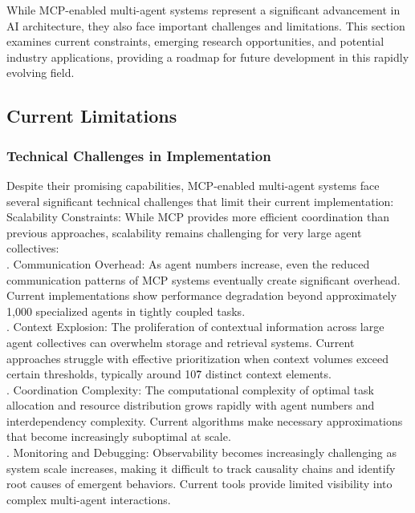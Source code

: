 While MCP-enabled multi-agent systems represent a significant advancement in AI architecture, they also face important challenges and limitations. This section examines current constraints, emerging research opportunities, and potential industry applications, providing a roadmap for future development in this rapidly evolving field.\\
\subsection{Current Limitations}
\subsubsection{Technical Challenges in Implementation}
Despite their promising capabilities, MCP-enabled multi-agent systems face several significant technical challenges that limit their current implementation:\\ \newline
Scalability Constraints: While MCP provides more efficient coordination than previous approaches, scalability remains challenging for very large agent collectives:\\ . Communication Overhead: As agent numbers increase, even the reduced communication patterns of MCP systems eventually create significant overhead. Current implementations show performance degradation beyond approximately 1,000 specialized agents in tightly coupled tasks.\\ . Context Explosion: The proliferation of contextual information across large agent collectives can overwhelm storage and retrieval systems. Current approaches struggle with effective prioritization when context volumes exceed certain thresholds, typically around 10\^7 distinct context elements.\\ . Coordination Complexity: The computational complexity of optimal task allocation and resource distribution grows rapidly with agent numbers and interdependency complexity. Current algorithms make necessary approximations that become increasingly suboptimal at scale.\\ . Monitoring and Debugging: Observability becomes increasingly challenging as system scale increases, making it difficult to track causality chains and identify root causes of emergent behaviors. Current tools provide limited visibility into complex multi-agent interactions.\\ \newline
